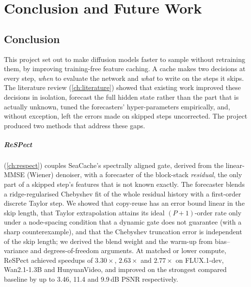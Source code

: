 \chapter{Conclusion and Future Work}\label{ch:conclusion}

\section{Conclusion}

This project set out to make diffusion models faster to sample without retraining them, by improving training-free feature caching. A cache makes two decisions at every step, \emph{when} to evaluate the network and \emph{what} to write on the steps it skips. The literature review (\cref{ch:literature}) showed that existing work improved these decisions in isolation, forecast the full hidden state rather than the part that is actually unknown, tuned the forecasters' hyper-parameters empirically, and, without exception, left the errors made on skipped steps uncorrected. The project produced two methods that address these gaps.

\paragraph{ReSPect} (\cref{ch:respect}) couples SeaCache's spectrally aligned gate, derived from the linear-MMSE (Wiener) denoiser, with a forecaster of the block-stack \emph{residual}, the only part of a skipped step's features that is not known exactly. The forecaster blends a ridge-regularised Chebyshev fit of the whole residual history with a first-order discrete Taylor step. We showed that copy-reuse has an error bound linear in the skip length, that Taylor extrapolation attains its ideal $(P{+}1)$-order rate only under a node-spacing condition that a dynamic gate does not guarantee (with a sharp counterexample), and that the Chebyshev truncation error is independent of the skip length; we derived the blend weight and the warm-up from bias--variance and degrees-of-freedom arguments. At matched or lower compute, ReSPect achieved speedups of $3.30\times$, $2.63\times$ and $2.77\times$ on FLUX.1-dev, Wan2.1-1.3B and HunyuanVideo, and improved on the strongest compared baseline by up to 3.46, 11.4 and 9.9\,dB PSNR respectively.

